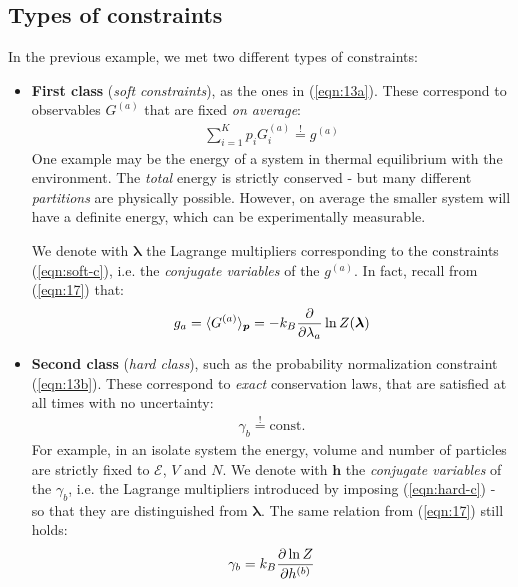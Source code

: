 \documentclass[../template.tex]{subfiles}
\begin{document}
\subsection{Types of constraints}
In the previous example, we met two different types of constraints:
\begin{itemize}
    \item \textbf{First class} (\textit{soft constraints}), as the ones in (\ref{eqn:13a}). These correspond to observables $G^{(a)}$ that are fixed \textit{on average}:
    \begin{align}\label{eqn:soft-c}
        \sum_{i=1}^K p_i G_i^{(a)} \overset{!}{=} g^{(a)}
    \end{align}
    One example may be the energy of a system in thermal equilibrium with the environment. The \textit{total} energy is strictly conserved - but many different \textit{partitions} are physically possible. However, on average the smaller system will have a definite energy, which can be experimentally measurable.  

    We denote with $\bm{\lambda}$ the Lagrange multipliers corresponding to the constraints (\ref{eqn:soft-c}), i.e. the \textit{conjugate variables} of the $g^{(a)}$. In fact, recall from (\ref{eqn:17}) that:
    \begin{align}
        g_a = \langle G^{(a)} \rangle_{\bm{p}} = -k_B \pdv{\lambda_a} \ln Z(\bm{\lambda})
    \end{align}

    \item \textbf{Second class} (\textit{hard class}), such as the probability normalization constraint (\ref{eqn:13b}). These correspond to \textit{exact} conservation laws, that are satisfied at all times with no uncertainty:
    \begin{align}\label{eqn:hard-c}
        \gamma_b \overset{!}{=} \text{const.}
    \end{align}
    For example, in an isolate system the energy, volume and number of particles are strictly fixed to $\mathcal{E}$, $V$ and $N$. We denote with $\bm{h}$ the \textit{conjugate variables} of the $\gamma_b$, i.e. the Lagrange multipliers introduced by imposing (\ref{eqn:hard-c}) - so that they are distinguished from $\bm{\lambda}$. The same relation from (\ref{eqn:17}) still holds:
    \begin{align}\label{eqn:21}
        \gamma_b = k_B \pdv{\ln Z}{h^{(b)}}
    \end{align}
\end{itemize}
\end{document}
